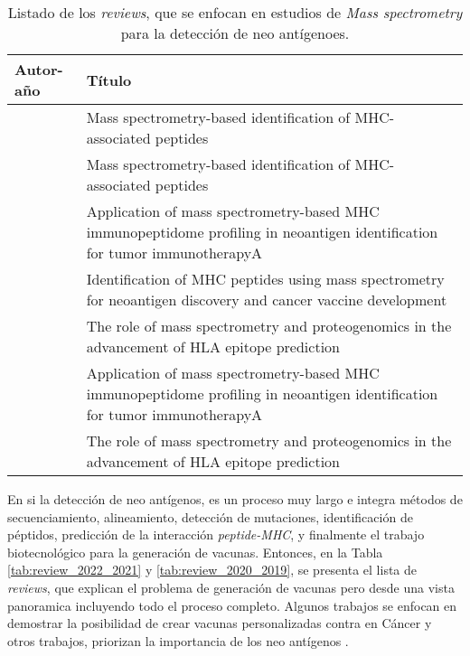 \begin{table}[H]
	\caption{Listado de los \textit{reviews}, que se enfocan en estudios de \textit{Mass spectrometry} para la detección de neo antígenoes.}
	\label{tab:review_ms}
	\begin{tabular}{p{3cm}p{10cm}}
	\textbf{Autor-año }                            & \textbf{Título}                                                                                                                                 \\ \hline
		\cite{kote2020mass}           & Mass spectrometry-based identification of MHC-associated peptides                                                          \\
		\cite{kote2020mass}           & Mass spectrometry-based identification of MHC-associated peptides                                                          \\
		\cite{zhang2019application}   & Application of mass spectrometry-based MHC immunopeptidome profiling in neoantigen identification for tumor immunotherapyA \\
		\cite{chen2021identification} & Identification of MHC peptides using mass spectrometry for neoantigen discovery and cancer vaccine development             \\
		\cite{creech2018role}         & The role of mass spectrometry and proteogenomics in the advancement of HLA epitope prediction                              \\
		\cite{zhang2019application}   & Application of mass spectrometry-based MHC immunopeptidome profiling in neoantigen identification for tumor immunotherapyA \\
		\cite{creech2018role}         & The role of mass spectrometry and proteogenomics in the advancement of HLA epitope prediction                             
	\end{tabular}
\end{table}


En si la detección de neo antígenos, es un proceso muy largo e integra métodos de secuenciamiento, alineamiento, detección de mutaciones, identificación de péptidos, predicción de la interacción \textit{peptide-MHC}, y finalmente el trabajo biotecnológico para la generación de vacunas. Entonces, en la Tabla \ref{tab:review_2022_2021} y \ref{tab:review_2020_2019}, se presenta el lista de \textit{reviews}, que explican el problema de generación de vacunas pero desde una vista panoramica incluyendo todo el proceso completo. Algunos trabajos se enfocan en demostrar la posibilidad de crear vacunas personalizadas contra en Cáncer \citep{lang2022identification, richard2022neoantigen, pao2022therapeutic, reynolds2022neoantigen, mccaffrey2022bioinformatic, fritsch2020personal} y otros trabajos, priorizan la importancia de los neo antígenos \citep{okada2022identification, zheng2022neoantigen, wang2021gene, pearlman2021targeting, arnaud2020biotechnologies, han2020progress}.


